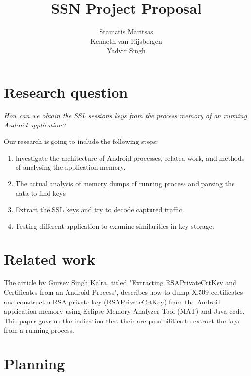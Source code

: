 \documentclass[11pt]{article}
\title{\textbf{SSN Project Proposal}}
\author{Stamatis Maritsas\\
		Kenneth van Rijsbergen\\
		Yadvir Singh}
\date{}
\begin{document}
\maketitle




\section{Research question}

\begin{framed}
\noindent \textit{How can we obtain the SSL sessions keys from the process memory of an running Android application?}
\end{framed}
Our research is going to include the following steps:

\begin{enumerate}
\item{Investigate the architecture of Android processes, related work, and methods of analysing the application memory.}
\item{The actual analysis of memory dumps of running process and parsing the data to find keys}
\item{Extract the SSL keys and try to decode captured traffic.}
\item{Testing different application to examine similarities in key storage.}
\end{enumerate}

\clearpage

\section{Related work}
The article by Gursev Singh Kalra, titled "Extracting RSAPrivateCrtKey and Certificates from an Android Process", describes how to dump X.509 certificates and construct a RSA private key (RSAPrivateCrtKey) from the Android application memory using Eclipse Memory Analyzer Tool (MAT) and Java code. This paper gave us the indication that their are possibilities to extract the keys from a running process. \cite{cite1}

\section{Planning}
\end{document}
